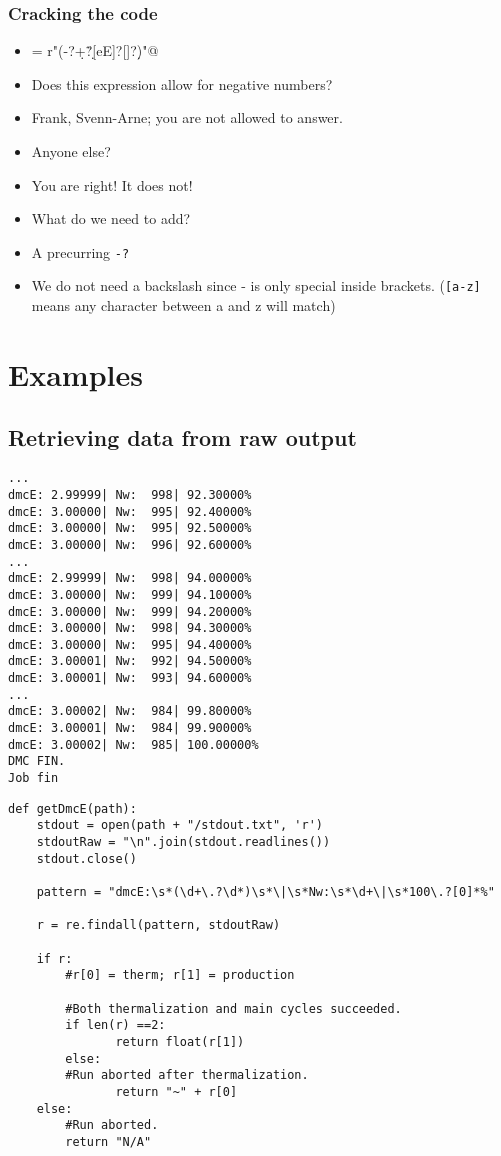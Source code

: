 \documentclass{beamer}
\begin{document}
\begin{frame}[fragile]
\frametitle{Cracking the code}
\scriptsize
\begin{itemize}
\item \verb@anyNumber = r"\s*(-?\d+\.?\d*[eE]?[\-\+]?\d*)\s*"@
\item Does this expression allow for negative numbers?
\item Frank, Svenn-Arne; you are not allowed to answer.
\item Anyone else?
\item You are right! It does not!
\item What do we need to add?
\item A precurring \verb+-?+
\item We do not need a backslash since - is only special inside brackets. (\verb+[a-z]+ means any character between a and z will match)
\end{itemize}
\normalsize
\end{frame}

\section{Examples}
\subsection{Retrieving data from raw output}

\begin{frame}[containsverbatim]
\scriptsize
\begin{verbatim}
...
dmcE: 2.99999| Nw:  998| 92.30000%
dmcE: 3.00000| Nw:  995| 92.40000%
dmcE: 3.00000| Nw:  995| 92.50000%
dmcE: 3.00000| Nw:  996| 92.60000%
...
dmcE: 2.99999| Nw:  998| 94.00000%
dmcE: 3.00000| Nw:  999| 94.10000%
dmcE: 3.00000| Nw:  999| 94.20000%
dmcE: 3.00000| Nw:  998| 94.30000%
dmcE: 3.00000| Nw:  995| 94.40000%
dmcE: 3.00001| Nw:  992| 94.50000%
dmcE: 3.00001| Nw:  993| 94.60000%
...
dmcE: 3.00002| Nw:  984| 99.80000%
dmcE: 3.00001| Nw:  984| 99.90000%
dmcE: 3.00002| Nw:  985| 100.00000%
DMC FIN.
Job fin
\end{verbatim}
\normalsize
\end{frame}

\begin{frame}[containsverbatim]
\scriptsize
\begin{verbatim}
def getDmcE(path):
    stdout = open(path + "/stdout.txt", 'r')
    stdoutRaw = "\n".join(stdout.readlines())
    stdout.close()
    
    pattern = "dmcE:\s*(\d+\.?\d*)\s*\|\s*Nw:\s*\d+\|\s*100\.?[0]*%"
    
    r = re.findall(pattern, stdoutRaw)
    
    if r:
        #r[0] = therm; r[1] = production

        #Both thermalization and main cycles succeeded.
        if len(r) ==2:
               return float(r[1])
        else:
        #Run aborted after thermalization.
               return "~" + r[0]
    else:
        #Run aborted.
        return "N/A"
\end{verbatim}
\normalsize
\end{frame}
\end{document}
